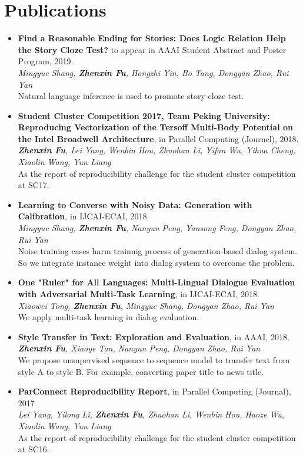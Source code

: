\documentclass[letterpaper]{article}
\begin{document}
\section*{Publications}
\begin{itemize}

\item \textbf{Find a Reasonable Ending for Stories: Does Logic Relation Help the Story Cloze Test?} to appear in AAAI Student Abstract and Poster Program, 2019. \\
{\it Mingyue Shang, \textbf{Zhenxin Fu}, Hongzhi Yin, Bo Tang, Dongyan Zhao, Rui Yan} \\
Natural language inference is used to promote story cloze test.

\item \textbf{Student Cluster Competition 2017, Team Peking University: Reproducing Vectorization of the Tersoff Multi-Body Potential on the Intel Broadwell Architecture}, in Parallel Computing (Journel), 2018. \\
{\it \textbf{Zhenxin Fu}, Lei Yang, Wenbin Hou, Zhuohan Li, Yifan Wu, Yihua Cheng, Xiaolin Wang, Yun Liang} \\
  As the report of reproducibility challenge for the student cluster competition at SC17.

\item \textbf{Learning to Converse with Noisy Data: Generation with Calibration}, in IJCAI-ECAI, 2018. \\
  {\it Mingyue Shang, \textbf{Zhenxin Fu}, Nanyun Peng, Yansong Feng, Dongyan Zhao, Rui Yan}  \\
  Noise training cases harm trainnig process of generation-based dialog system. So we integrate instance weight into dialog system to overcome the problem.

\item \textbf{One "Ruler" for All Languages: Multi-Lingual Dialogue Evaluation with Adversarial Multi-Task Learning}, in IJCAI-ECAI, 2018. \\
  {\it Xiaowei Tong, \textbf{Zhenxin Fu}, Mingyue Shang, Dongyan Zhao, Rui Yan} \\
  We apply multi-task learning in dialog evaluation.

\item \textbf{Style Transfer in Text: Exploration and Evaluation}, in AAAI, 2018. \\
  {\it \textbf{Zhenxin Fu}, Xiaoye Tan, Nanyun Peng, Dongyan Zhao, Rui Yan} \\
  We propose unsupervised sequence to sequence model to transfer text from style A to style B. For example, converting paper title to news title.
  
\item \textbf{ParConnect Reproducibility Report}, in Parallel Computing (Journal), 2017\\
  {\it Lei Yang, Yilong Li, \textbf{Zhenxin Fu}, Zhuohan Li, Wenbin Hou, Haoze Wu, Xiaolin Wang, Yun Liang} \\
  As the report of reproducibility challenge for the student cluster competition at SC16.
\end{itemize}
\end{document}
